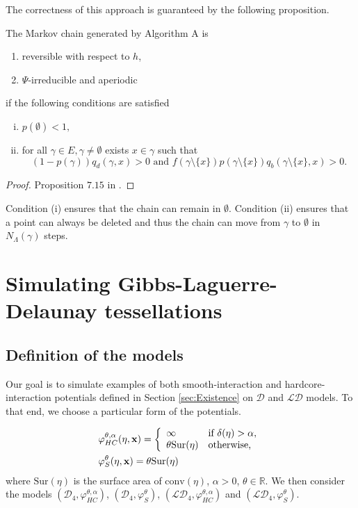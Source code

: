\noindent The correctness of this approach is guaranteed by the following proposition.

\begin{proposition}
The Markov chain generated by Algorithm A is
\begin{enumerate}
\item reversible with respect to $h$,
\item $\Psi$-irreducible and aperiodic 
\end{enumerate}
if  the following conditions are satisfied
\begin{enumerate}[(i)]
	\item $p(\emptyset)<1,$
	\item for all $\gamma \in E, \gamma\neq \emptyset$ exists $x \in \gamma$ such that
	$$(1-p(\gamma))q_d(\gamma,x)>0 \text{ and } f(\gamma\setminus \{x\})p(\gamma \setminus \{x\}) q_b(\gamma\setminus \{x\},x)>0.$$ 
\end{enumerate}
\end{proposition}
\begin{proof}
Proposition $7.15$ in \cite{MollerWaagepetersen2003}.
\end{proof}

Condition (i) ensures that the chain can remain in $\emptyset$. Condition (ii) ensures that a point can always be deleted and thus the chain can move from $\gamma$ to $\emptyset$ in $N_\Lambda(\gamma)$ steps.



\section{Simulating Gibbs-Laguerre-Delaunay tessellations}
\subsection{Definition of the models}
Our goal is to simulate examples of both smooth-interaction and hardcore-interaction potentials defined in Section \ref{sec:Existence} on $\mathcal D$ and $\mathcal {LD}$ models. To that end, we choose a particular form of the potentials.

\begin{align}\label{modelHC}
&\varphi^{\theta,\alpha}_{HC}(\eta,{\mathbf{x}}) = 
\left\{
    \begin{array}{ll}
        \infty & \mbox{if } \delta(\eta)> \alpha, \\
        \theta \mathrm{Sur}(\eta) & \mbox{otherwise, }
    \end{array}
\right. \\
&\varphi^{\theta}_{S}(\eta,{\mathbf{x}}) =  \theta \mathrm{Sur}(\eta) 
\end{align}
where $\mathrm{Sur}(\eta)$ is the surface area of $\mathrm{conv}(\eta)$, $\alpha>0$, $\theta \in \mathbb R$. We then consider the models $(\mathcal D_4,\varphi^{\theta,\alpha}_{HC})$, $(\mathcal D_4,\varphi^{\theta}_{S})$, $(\mathcal {LD}_4,\varphi^{\theta,\alpha}_{HC})$ and $(\mathcal {LD}_4,\varphi^{\theta}_{S})$.



